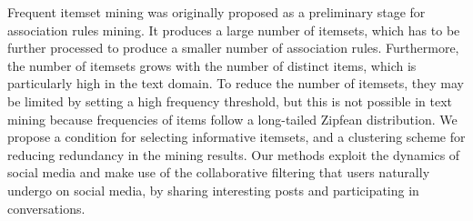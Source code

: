 \documentclass{sig-alternate}
\begin{document}
Frequent itemset mining was originally proposed as a preliminary stage for
association rules mining.
It produces a large number of itemsets, which
has to be further processed to 
produce a smaller number of association rules.
Furthermore, the number of itemsets grows with the number of
distinct items, which is particularly high in the text domain.
To reduce the number of itemsets, they may be limited by setting a high
frequency threshold, but this is not possible in text mining because
frequencies of items follow a long-tailed Zipfean distribution.
We propose a condition for selecting informative itemsets, 
and a clustering scheme for reducing redundancy in the mining results.
Our methods exploit the dynamics of social media 
and make use of the collaborative filtering
that users naturally undergo on social media, 
by sharing interesting posts and participating in conversations.



\end{document}
